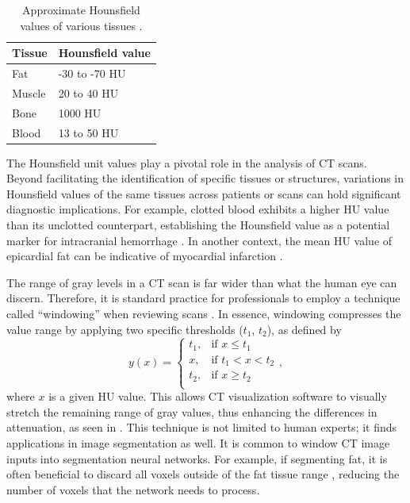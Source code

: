 \begin{table}[t!]
\centering
\def\arraystretch{1.2}
\begin{tabularx}{\textwidth}{X X}
 \textbf{Tissue} & \textbf{Hounsfield value} \\
 \hline
 Fat & -30 to -70 HU\\
 Muscle & 20 to 40 HU\\
 Bone & 1000 HU \\
 Blood & 13 to 50 HU\\
\end{tabularx}
\caption{Approximate Hounsfield values of various tissues \cite{fosbinder2011essentials, kamalianComputedTomographyImaging2016}.}
\label{tab:hu-tissues}
\end{table}

The Hounsfield unit values play a pivotal role in the analysis of CT scans. Beyond facilitating the identification of specific tissues or structures, variations in Hounsfield values of the same tissues across patients or scans can hold significant diagnostic implications. For example, clotted blood exhibits a higher HU value than its unclotted counterpart, establishing the Hounsfield value as a potential marker for intracranial hemorrhage \cite{kamalianComputedTomographyImaging2016}. In another context, the mean HU value of epicardial fat can be indicative of myocardial infarction \cite{mahabadiCardiacComputedTomographyderived2017}.

The range of gray levels in a CT scan is far wider than what the human eye can discern. Therefore, it is standard practice for professionals to employ a technique called ``windowing'' when reviewing scans \cite{babaWindowingCT2017}. In essence, windowing compresses the value range by applying two specific thresholds ($t_1$, $t_2$), as defined by
\begin{equation}
y(x) = 
    \begin{cases}
        t_1, & \text{if } x \leq t_1\\
        x, & \text{if } t_1 < x < t_2\\
        	t_2, & \text{if } x \geq t_2\\
    \end{cases},
\end{equation}
where $x$ is a given HU value. This allows CT visualization software to visually stretch the remaining range of gray values, thus enhancing the differences in attenuation, as seen in . This technique is not limited to human experts; it finds applications in image segmentation as well. It is common to window CT image inputs into segmentation neural networks. For example, if segmenting fat, it is often beneficial to discard all voxels outside of the fat tissue range \cite{bencevicRecentProgressEpicardial2022}, reducing the number of voxels that the network needs to process.

